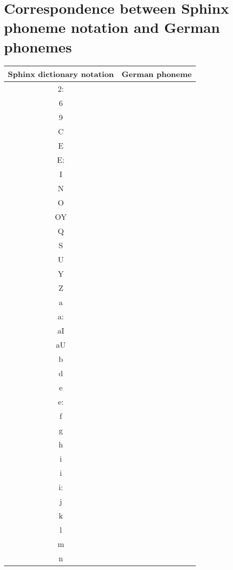 \chapter{Correspondence between Sphinx phoneme notation and German phonemes }
\label{chap:appA}
\begin {longtable}{| c | c |}
    \hline
    Sphinx dictionary notation & German phoneme \\ \hline
    2:  &  \\ \hline
    6 &  \\ \hline
    9  &  \\ \hline
    C  &  \\ \hline
    E  & \\ \hline
    E:  & \\ \hline 
    I  & \\ \hline 
    N  & \\ \hline 
    O  & \\ \hline 
    OY  & \\ \hline 
    Q  & \\ \hline 
    S  & \\ \hline 
    U  & \\ \hline 
    Y  & \\ \hline 
    Z  & \\ \hline 
    a  & \\ \hline 
    a:  & \\ \hline
    aI   & \\ \hline
    aU  & \\ \hline
    b  & \\ \hline
    d  & \\ \hline
    e  & \\ \hline
    e:  & \\ \hline
    f  & \\ \hline
    g  & \\ \hline
    h  & \\ \hline
    i  & \\ \hline 
    i  & \\ \hline 
    i:  & \\ \hline 
    j  & \\ \hline 
    k  & \\ \hline 
    l  & \\ \hline 
    m & \\ \hline 
    n  & \\ \hline 

\end{longtable}
